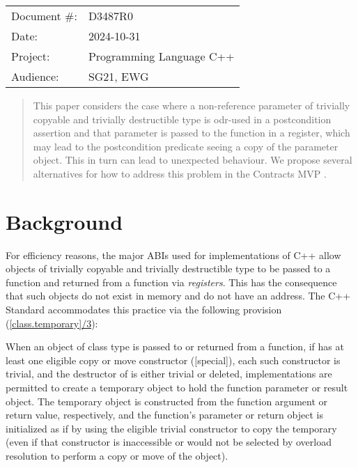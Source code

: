 \begin{tabular}{ll}
Document \#: & D3487R0 \\
Date: &2024-10-31 \\
Project: & Programming Language C++ \\
Audience: & SG21, EWG
\end{tabular}

\begin{abstract}
This paper considers the case where a non-reference parameter of trivially copyable and trivially destructible type is odr-used in a postcondition assertion and that parameter is passed to the function in a register, which may lead to the postcondition predicate seeing a copy of the parameter object. This in turn can lead to unexpected behaviour. We propose several alternatives for how to address this problem in the Contracts MVP \cite{P2900R10}.
\end{abstract}







\section{Background}
\label{bg}

For efficiency reasons, the major ABIs used for implementations of C++ allow objects of trivially copyable and trivially destructible type to be passed to a function and returned from a function via \emph{registers}. This has the consequence that such objects do not exist in memory and do not have an address. The C++ Standard accommodates this practice via the following provision (\href{https://timsong-cpp.github.io/cppwp/n4950/class.temporary#3}{[class.temporary]/3}):

\begin{adjustwidth}{0.5cm}{0.5cm}
When an object of class type  is passed to or returned from a function, if  has at least one eligible copy or move constructor ([special]), each such constructor is trivial, and the destructor of  is either trivial or deleted, implementations are permitted to create a temporary object to hold the function parameter or result object. The temporary object is constructed from the function argument or return value, respectively, and the function's parameter or return object is initialized as if by using the eligible trivial constructor to copy the temporary (even if that constructor is inaccessible or would not be selected by overload resolution to perform a copy or move of the object).
\end{adjustwidth}

